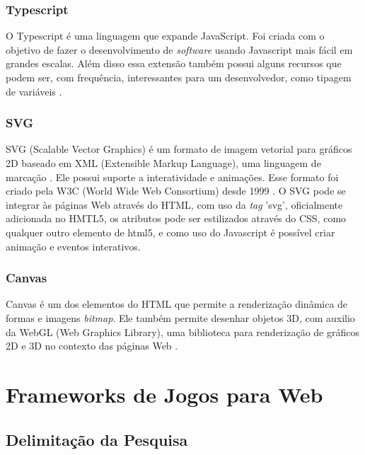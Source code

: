 \subsection{ Typescript }

O Typescript é uma linguagem que expande JavaScript. Foi criada com o objetivo de fazer o desenvolvimento de \textit{software} usando Javascript mais fácil em grandes escalas. Além disso essa extensão também possui alguns recursos que podem ser, com frequência, interessantes para um desenvolvedor, como tipagem de variáveis \cite{bierman2014understanding}.

 \subsection{ SVG }
 
 SVG  (Scalable Vector Graphics) é um formato de imagem vetorial para gráficos 2D baseado em XML  (Extensible Markup Language), uma linguagem de marcação
 \cite{ferraiolo2000scalable}. Ele possui suporte
 a interatividade e animações. Esse formato foi
 criado pela W3C (World Wide Web Consortium) desde
 1999 \cite{ferraiolo2000scalable}. O SVG pode se
 integrar às páginas Web através do HTML, com uso
 da \textit{tag} 'svg', oficialmente adicionada
 no HMTL5, os atributos pode ser estilizados
 através do CSS, como qualquer outro elemento de
 html5, e como uso do Javascript é possível criar animação e eventos interativos.
 
\subsection{ Canvas }
 
Canvas é um dos elementos do HTML que permite a renderização dinâmica de formas e  imagens \textit{bitmap}. Ele também
permite desenhar objetos 3D, com auxilio da WebGL (Web Graphics Library), uma biblioteca para renderização de gráficos 2D e 3D
no contexto das páginas Web \cite{shappir2012performing}.

\chapter{Frameworks de Jogos para Web}

\section{Delimitação da Pesquisa}

